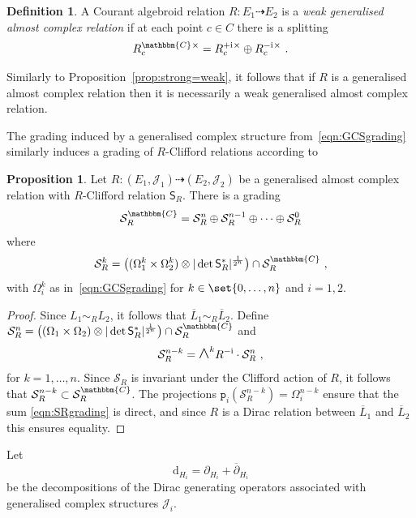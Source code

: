 \documentclass[a4paper, reqno, 11pt]{amsart}
\numberwithin{equation}{section}
\theoremstyle{definition}
\newtheorem{definition}[equation]{Definition}
\newtheorem{proposition}[equation]{Proposition}
\newcommand{\de}{\mathrm{d}}
\newcommand{\ii}{\mathrm{i}}
\newcommand{\rmp}{\mathtt{p}}
\newcommand{\IC}{\mathbbm{C}}
\newcommand{\cS}{{\mathcal S}}
\newcommand{\cJ}{{\mathcal J}}
\newcommand{\sfS}{{\mathsf{S}}}
\newcommand{\midwedge}{\text {\Large$\wedge$}}
\newcommand{\rel}{\dashrightarrow}
\theoremstyle{remark}
\begin{document}
\begin{definition}
    A Courant algebroid relation $R \colon E_1 \rel E_2$ is a \emph{weak generalised almost complex relation} if at each point $c\in C$ there is a splitting
    \begin{align}
        R^\IC_c{}^\times = R^{+\ii}_c{}^\times \oplus R^{-\ii}_c{}^\times \ .
    \end{align}
\end{definition}

Similarly to Proposition~\ref{prop:strong=weak}, it follows that if $R$ is a generalised almost complex relation then it is necessarily a weak generalised almost complex relation.

The grading induced by a generalised complex structure from~\eqref{eqn:GCSgrading} similarly induces a grading of $R$-Clifford relations according to

\begin{proposition}
    Let $R \colon (E_1, \cJ_1) \rel (E_2, \cJ_2)$ be a generalised almost complex relation with $R$-Clifford relation $\sfS_R$. There is a grading
    \begin{align}\label{eqn:SRgrading}
        \cS_R^\IC = \cS_R^n \oplus \cS_R^{n-1} \oplus \cdots \oplus \cS^0_R
    \end{align}
    where $$\cS^k_R = \big((\Omega^k_1 \times \Omega_2^k) \otimes|\det \sfS_R^* |^{\frac{1}{2^n}}\big) \cap \cS^\IC_R \ , $$ with $\Omega_i^k$ as in~\eqref{eqn:GCSgrading} for $k\in\set{0,\ldots,n}$ and $i=1,2$.
\end{proposition}

\begin{proof}
    Since $L_1 \sim_R L_2$, it follows that $\overline{L}_1 \sim_R \overline{L}_2$. Define $\cS_R^n = \big((\Omega_1 \times \Omega_2)\otimes |\det \sfS_R^* |^{\frac{1}{2^n}}\big)\cap\cS_R^\IC$ and 
    \begin{align}
        \cS_R^{n-k} = \midwedge^k R^{-\ii} \cdot \cS_R^n \ ,
    \end{align}
    for $k=1,\dots,n$.
    Since $\cS_R$ is invariant under the Clifford action of $R$, it follows that $\cS_R^{n-k} \subset \cS_R^\IC$. The projections $\rmp_i(\cS_R^{n-k}) = \Omega_i^{n-k}$ ensure that the sum \eqref{eqn:SRgrading} is direct, and since $R$ is a Dirac relation between $\overline L_1$ and $\overline L_2$ this ensures equality.
\end{proof}

Let $$\de_{H_i} = \partial_{H_i} + \overline{\partial}_{H_i}$$ be the decompositions of the Dirac generating operators associated with  generalised complex structures $\cJ_i$. 
\end{document}
